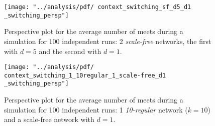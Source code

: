 \begin{figure}[H]
	\centering
	\texttt{[image: "../analysis/pdf/ context\_switching\_sf\_d5\_d1 \_switching\_persp"]}
	\begin{minipage}{0.9\textwidth}
		\caption{Perspective plot for the average number of meets during a simulation for 100 independent runs: 2 \textit{scale-free} networks, the first with $d=5$ and the second with $d=1$.}
		\label{append_fig:ctx_cs_sf_d5_d1}
	\end{minipage}
\end{figure}


\begin{figure}[H]
	\centering
	\texttt{[image: "../analysis/pdf/ context\_switching\_1\_10regular\_1\_scale-free\_d1 \_switching\_persp"]}
	\begin{minipage}{0.9\textwidth}
		\caption{Perspective plot for the average number of meets during a simulation for 100 independent runs: 1 \textit{10-regular} network ($k=10$) and a scale-free network with $d=1$.
		}
		\label{append_fig:ctx_cs_kreg10_sfd1}
	\end{minipage}
\end{figure}



